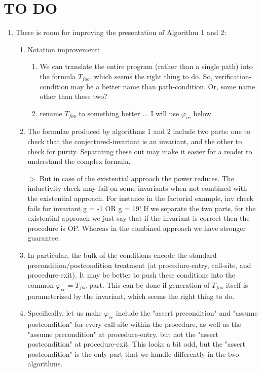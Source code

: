 \section*{TO DO}

\begin{enumerate}

\item There is room for improving the presentation of Algorithm 1 and 2:
\begin{enumerate}

\item Notation improvement:
\begin{enumerate}
\item We can translate the entire program (rather than a single path)
into the formula $T_{foo}$, which seems the right thing to do. So,
verification-condition may be a better name than path-condition.
Or, some name other than these two?
\item rename $T_{foo}$ to something better ... I will use $\varphi_{vc}$
below.
\end{enumerate}

\item The formulae produced by algorithms 1 and 2 include two parts:
one to check that the conjectured-invariant is an invariant, and the
other to check for purity. Separating these out may make it easier for
a reader to understand the complex formula.

$>$ But in case of the existential approach the power reduces. The
inductivity check may fail on some invariants when not combined with
the existential approach. For instance in the factorial example, inv
check fails for invariant g = -1 OR g = 19! If we separate the two
parts, for the existential approach we just say that if the invariant
is correct then the procedure is OP. Whereas in the combined approach
we have stronger guarantee. 

\item In particular, the bulk of the conditions encode the standard
precondition/postcondition treatment (at procedure-entry, call-site,
and procedure-exit). It may be better to push these conditions into
the common $\varphi_{vc} = T_{foo}$ part. This can be done if generation of
$T_{foo}$ itself is parameterized by the invariant, which seems the right thing to do.

\item Specifically, let us make $\varphi_{vc}$ include the "assert precondition"
and "assume postcondition" for every call-site within the procedure, as well
as the "assume precondition" at procedure-entry, but not the "assert
postcondition" at procedure-exit. This looks a bit odd, but the "assert
postcondition" is the only part that we handle differently in the two algorithms.


\end{enumerate}
\end{enumerate}
